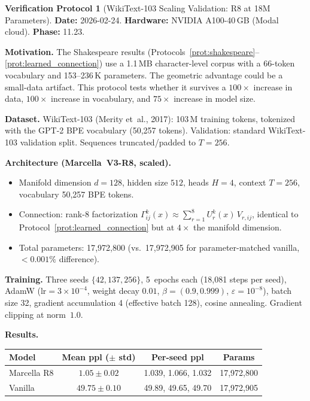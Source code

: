 \documentclass[11pt,a4paper]{article}
\theoremstyle{definition}
\newtheorem{protocol}[theorem]{Verification Protocol}
\theoremstyle{remark}
\begin{document}
\begin{protocol}[WikiText-103 Scaling Validation: R8 at 18M 
Parameters]%
\label{prot:wikitext103}
\textbf{Date:} 2026-02-24.  \textbf{Hardware:} NVIDIA A100-40\,GB 
(Modal cloud).  \textbf{Phase:} 11.23.

\medskip
\textbf{Motivation.} The Shakespeare results 
(Protocols~\ref{prot:shakespeare}--\ref{prot:learned_connection}) 
use a 1.1\,MB character-level corpus with a 66-token vocabulary 
and 153--236\,K parameters. The geometric advantage could be a 
small-data artifact. This protocol tests whether it survives a 
$100\times$ increase in data, $100\times$ increase in vocabulary, 
and $75\times$ increase in model size.

\medskip
\textbf{Dataset.} WikiText-103 
(Merity et~al., 2017): 103\,M training tokens, tokenized with 
the GPT-2 BPE vocabulary (50{,}257 tokens). Validation: standard 
WikiText-103 validation split. Sequences truncated/padded to 
$T = 256$.

\medskip
\textbf{Architecture (Marcella~V3-R8, scaled).}
\begin{itemize}[nosep]
  \item Manifold dimension $d = 128$, hidden size $512$, heads 
  $H = 4$, context $T = 256$, vocabulary 50{,}257 BPE tokens.
  \item Connection: rank-8 factorization 
  $\Gamma^k_{ij}(x) \approx \sum_{r=1}^{8} U^k_r(x)\, V_{r,ij}$, 
  identical to Protocol~\ref{prot:learned_connection} but at 
  $4\times$ the manifold dimension.
  \item Total parameters: 17{,}972{,}800 (vs.\ 17{,}972{,}905 for 
  parameter-matched vanilla, $< 0.001\%$ difference).
\end{itemize}

\textbf{Training.} Three seeds $\{42, 137, 256\}$, 
5~epochs each (18{,}081 steps per seed), AdamW 
($\mathrm{lr} = 3 \times 10^{-4}$, weight decay $0.01$, 
$\beta = (0.9, 0.999)$, $\varepsilon = 10^{-8}$), 
batch size 32, gradient accumulation 4 (effective batch 128), 
cosine annealing. Gradient clipping at norm~$1.0$.

\medskip
\textbf{Results.}
\begin{center}
\begin{tabular}{lccc}
\toprule
Model & Mean ppl ($\pm$ std) & Per-seed ppl & Params \\
\midrule
Marcella R8 & $\mathbf{1.05 \pm 0.02}$ & 
  1.039, 1.066, 1.032 & 17{,}972{,}800 \\
Vanilla & $49.75 \pm 0.10$ & 
  49.89, 49.65, 49.70 & 17{,}972{,}905 \\
\bottomrule
\end{tabular}
\end{center}


\end{protocol}
\end{document}
